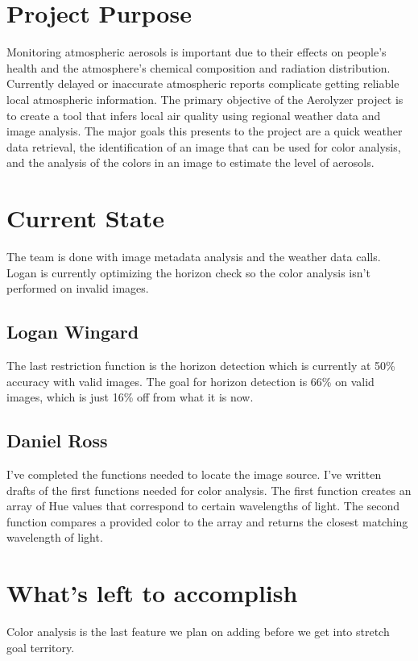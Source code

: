 \documentclass[onecolumn, draftclsnofoot,10pt, compsoc]{IEEEtran}
\begin{document}
\tableofcontents




\clearpage

\begin{singlespace}

	\section{Project Purpose}
		Monitoring atmospheric aerosols is important due to their effects on people’s health and the atmosphere's chemical composition and radiation distribution.\cite{template}
		Currently delayed or inaccurate atmospheric reports complicate getting reliable local atmospheric information.
		The primary objective of the Aerolyzer project is to create a tool that infers local air quality using regional weather data and image analysis.
		The major goals this presents to the project are a quick weather data retrieval, the identification of an image that can be used for color analysis, and the analysis of the colors in an image to estimate the level of aerosols.
	
	\section{Current State}
		The team is done with image metadata analysis and the weather data calls.
		Logan is currently optimizing the horizon check so the color analysis isn't performed on invalid images.
		\subsection{Logan Wingard}
			The last restriction function is the horizon detection which is currently at 50\% accuracy with valid images.
			The goal for horizon detection is 66\% on valid images, which is just 16\% off from what it is now.
		\subsection{Daniel Ross}
			I've completed the functions needed to locate the image source.
			I've written drafts of the first functions needed for color analysis.
			The first function creates an array of Hue values that correspond to certain wavelengths of light.
			The second function compares a provided color to the array and returns the closest matching wavelength of light.
			
	\section{What's left to accomplish}
		Color analysis is the last feature we plan on adding before we get into stretch goal territory.

\end{singlespace}
\end{document}
